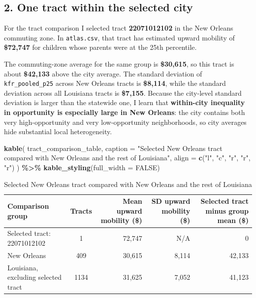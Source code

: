 \documentclass[
]{article}
\newenvironment{Shaded}{\begin{snugshade}}{\end{snugshade}}
\newcommand{\AttributeTok}[1]{\textcolor[rgb]{0.13,0.29,0.53}{#1}}
\newcommand{\ConstantTok}[1]{\textcolor[rgb]{0.56,0.35,0.01}{#1}}
\newcommand{\FunctionTok}[1]{\textcolor[rgb]{0.13,0.29,0.53}{\textbf{#1}}}
\newcommand{\NormalTok}[1]{#1}
\newcommand{\SpecialCharTok}[1]{\textcolor[rgb]{0.81,0.36,0.00}{\textbf{#1}}}
\newcommand{\StringTok}[1]{\textcolor[rgb]{0.31,0.60,0.02}{#1}}
\begin{document}
\subsection{2. One tract within the selected
city}\label{one-tract-within-the-selected-city}

For the tract comparison I selected tract \textbf{22071012102} in the
New Orleans commuting zone. In \texttt{atlas.csv}, that tract has
estimated upward mobility of \textbf{\$72,747} for children whose
parents were at the 25th percentile.

The commuting-zone average for the same group is \textbf{\$30,615}, so
this tract is about \textbf{\$42,133} above the city average. The
standard deviation of \texttt{kfr\_pooled\_p25} across New Orleans
tracts is \textbf{\$8,114}, while the standard deviation across all
Louisiana tracts is \textbf{\$7,155}. Because the city-level standard
deviation is larger than the statewide one, I learn that
\textbf{within-city inequality in opportunity is especially large in New
Orleans}: the city contains both very high-opportunity and very
low-opportunity neighborhoods, so city averages hide substantial local
heterogeneity.

\begin{Shaded}
\begin{Highlighting}[]
\FunctionTok{kable}\NormalTok{(}
\NormalTok{  tract\_comparison\_table,}
  \AttributeTok{caption =} \StringTok{"Selected New Orleans tract compared with New Orleans and the rest of Louisiana"}\NormalTok{,}
  \AttributeTok{align =} \FunctionTok{c}\NormalTok{(}\StringTok{"l"}\NormalTok{, }\StringTok{"c"}\NormalTok{, }\StringTok{"r"}\NormalTok{, }\StringTok{"r"}\NormalTok{, }\StringTok{"r"}\NormalTok{)}
\NormalTok{) }\SpecialCharTok{\%\textgreater{}\%}
  \FunctionTok{kable\_styling}\NormalTok{(}\AttributeTok{full\_width =} \ConstantTok{FALSE}\NormalTok{)}
\end{Highlighting}
\end{Shaded}

\begin{longtable}[t]{lcrrr}
\caption{\label{tab:tract-comparison-table}Selected New Orleans tract compared with New Orleans and the rest of Louisiana}\\
\toprule
Comparison group & Tracts & Mean upward mobility (\$) & SD upward mobility (\$) & Selected tract minus group mean (\$)\\
\midrule
Selected tract: 22071012102 & 1 & 72,747 & N/A & 0\\
New Orleans & 409 & 30,615 & 8,114 & 42,133\\
Louisiana, excluding selected tract & 1134 & 31,625 & 7,052 & 41,123\\
\bottomrule
\end{longtable}
\end{document}
